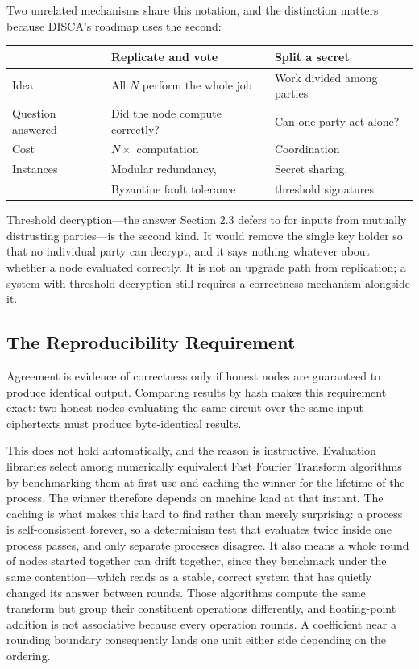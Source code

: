 \documentclass[12pt,a4paper]{article}
\begin{document}
Two unrelated mechanisms share this notation, and the distinction matters because DISCA's roadmap uses the second:

\begin{center}
\begin{tabular}{lll}
\hline
 & Replicate and vote & Split a secret \\
\hline
Idea & All $N$ perform the whole job & Work divided among parties \\
Question answered & Did the node compute correctly? & Can one party act alone? \\
Cost & $N \times$ computation & Coordination \\
Instances & Modular redundancy, & Secret sharing, \\
 & Byzantine fault tolerance~\cite{byzantine_generals} & threshold signatures~\cite{shamir_secret_sharing} \\
\hline
\end{tabular}
\end{center}

Threshold decryption---the answer Section 2.3 defers to for inputs from mutually distrusting parties---is the second kind.
It would remove the single key holder so that no individual party can decrypt, and it says nothing whatever about whether a node evaluated correctly.
It is not an upgrade path from replication; a system with threshold decryption still requires a correctness mechanism alongside it.

\subsection{The Reproducibility Requirement}

Agreement is evidence of correctness only if honest nodes are guaranteed to produce identical output.
Comparing results by hash makes this requirement exact: two honest nodes evaluating the same circuit over the same input ciphertexts must produce byte-identical results.

This does not hold automatically, and the reason is instructive.
Evaluation libraries select among numerically equivalent Fast Fourier Transform algorithms by benchmarking them at first use and caching the winner for the lifetime of the process.
The winner therefore depends on machine load at that instant.
The caching is what makes this hard to find rather than merely surprising: a process is self-consistent forever, so a determinism test that evaluates twice inside one process passes, and only separate processes disagree.
It also means a whole round of nodes started together can drift together, since they benchmark under the same contention---which reads as a stable, correct system that has quietly changed its answer between rounds.
Those algorithms compute the same transform but group their constituent operations differently, and floating-point addition is not associative because every operation rounds.
A coefficient near a rounding boundary consequently lands one unit either side depending on the ordering.
\end{document}

